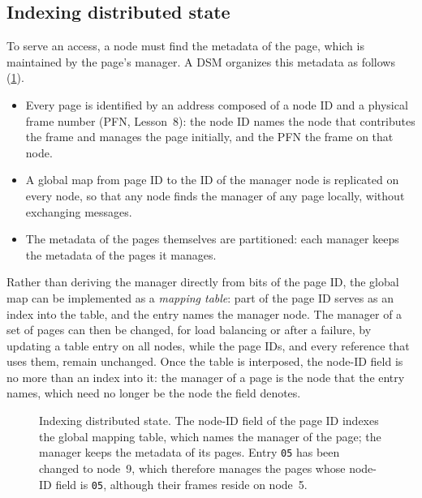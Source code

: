 \documentclass[../main.tex]{subfiles}
\begin{document}
\subsection{Indexing distributed state}
\label{sec:l15-indexing}

To serve an access, a node must find the metadata of the page, which is
maintained by the page's manager.  A DSM organizes this metadata as
follows (\cref{fig:l15-indexing}).
\begin{itemize}
  \item Every page is identified by an address composed of a node ID and a
    physical frame number (PFN, Lesson~8): the
    node ID names the node that contributes the frame and manages the page
    initially, and the PFN the frame on that node.
  \item A global map from page ID to the ID of the manager node is
    replicated on every node, so that any node finds the manager of any
    page locally, without exchanging messages.
  \item The metadata of the pages themselves are partitioned: each manager
    keeps the metadata of the pages it manages.
\end{itemize}
Rather than deriving the manager directly from bits of the page ID, the
global map can be implemented as a \emph{mapping table}: part of the page
ID serves as an index into the table, and the entry names the manager
node.  The manager of a set of pages can then be changed, for load
balancing or after a failure, by updating a table entry on all nodes, while
the page IDs, and every reference that uses them, remain unchanged.  Once
the table is interposed, the node-ID field is no more than an index into
it: the manager of a page is the node that the entry names, which need no
longer be the node the field denotes.

\begin{figure}[htbp]
  \centering
  
  \caption{Indexing distributed state.  The node-ID field of the page ID
    indexes the global mapping table, which names the manager of the page;
    the manager keeps the metadata of its pages.  Entry \texttt{05} has
    been changed to node~9, which therefore manages the pages whose node-ID
    field is \texttt{05}, although their frames reside on node~5.}
  \label{fig:l15-indexing}
\end{figure}
\end{document}

